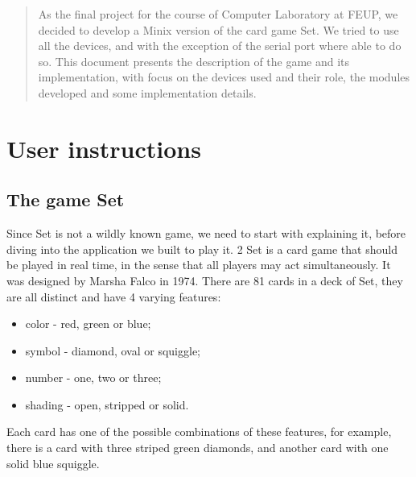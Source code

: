 \documentclass[11pt,a4paper,reqno]{report}
\numberwithin{equation}{section}
\begin{document}



\begin{abstract}
	
As the final project for the course of Computer Laboratory at FEUP, we decided to develop a Minix version of the card game Set. We tried to use all the devices, and with the exception of the serial port where able to do so. This document presents the description of the game and its implementation, with focus on the devices used and their role, the modules developed and some implementation details.

\end{abstract}

\tableofcontents

\chapter{User instructions}

\section{The game Set}

Since Set is not a wildly known game, we need to start with explaining it, before diving into the application we built to play it.
2
Set is a card game that should be played in real time, in the sense that all players may act simultaneously. It was designed by Marsha Falco in 1974. There are 81 cards in a deck of Set, they are all distinct and have 4 varying features:
\begin{itemize}
\item color - red, green or blue;
\item symbol - diamond, oval or squiggle;
\item number - one, two or three;
\item shading - open, stripped or solid.
\end{itemize}
Each card has one of the possible combinations of these features, for example, there is a card with three striped green diamonds, and another card with one solid blue squiggle.
\end{document}
